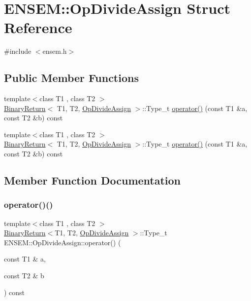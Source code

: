 \hypertarget{structENSEM_1_1OpDivideAssign}{}\section{E\+N\+S\+EM\+:\+:Op\+Divide\+Assign Struct Reference}
\label{structENSEM_1_1OpDivideAssign}


{\ttfamily \#include $<$ensem.\+h$>$}

\subsection*{Public Member Functions}
\begin{DoxyCompactItemize}
\item 
{\footnotesize template$<$class T1 , class T2 $>$ }\\\mbox{\hyperlink{structENSEM_1_1BinaryReturn}{Binary\+Return}}$<$ T1, T2, \mbox{\hyperlink{structENSEM_1_1OpDivideAssign}{Op\+Divide\+Assign}} $>$\+::Type\+\_\+t \mbox{\hyperlink{structENSEM_1_1OpDivideAssign_a16a1ece4c032ceb92428ac26535c4ae9}{operator()}} (const T1 \&a, const T2 \&b) const
\item 
{\footnotesize template$<$class T1 , class T2 $>$ }\\\mbox{\hyperlink{structENSEM_1_1BinaryReturn}{Binary\+Return}}$<$ T1, T2, \mbox{\hyperlink{structENSEM_1_1OpDivideAssign}{Op\+Divide\+Assign}} $>$\+::Type\+\_\+t \mbox{\hyperlink{structENSEM_1_1OpDivideAssign_a16a1ece4c032ceb92428ac26535c4ae9}{operator()}} (const T1 \&a, const T2 \&b) const
\end{DoxyCompactItemize}


\subsection{Member Function Documentation}
\mbox{\label{structENSEM_1_1OpDivideAssign_a16a1ece4c032ceb92428ac26535c4ae9}} 
\subsubsection{\texorpdfstring{operator()()}{operator()()}\hspace{0.1cm}{\footnotesize\ttfamily [1/2]}}
{\footnotesize\ttfamily template$<$class T1 , class T2 $>$ \\
\mbox{\hyperlink{structENSEM_1_1BinaryReturn}{Binary\+Return}}$<$T1, T2, \mbox{\hyperlink{structENSEM_1_1OpDivideAssign}{Op\+Divide\+Assign}} $>$\+::Type\+\_\+t E\+N\+S\+E\+M\+::\+Op\+Divide\+Assign\+::operator() (\begin{DoxyParamCaption}\item[{const T1 \&}]{a,  }\item[{const T2 \&}]{b }\end{DoxyParamCaption}) const\hspace{0.3cm}{\ttfamily [inline]}}

